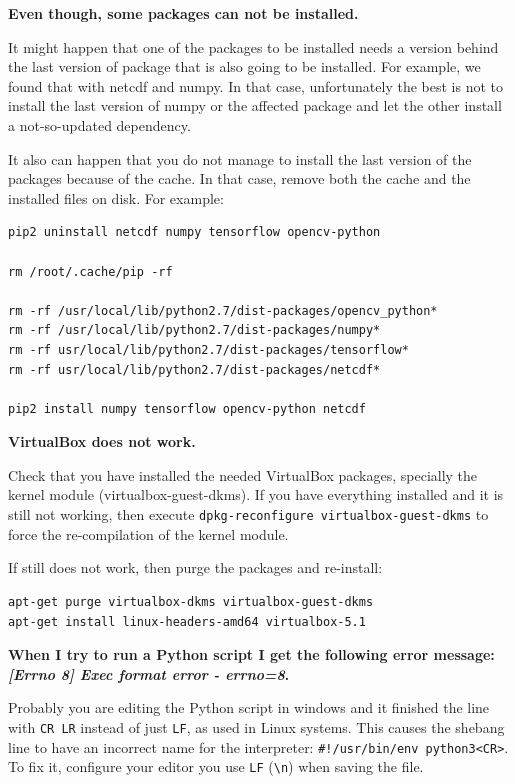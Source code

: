 \documentclass[a4paper,12pt]{article}
\begin{document}
\textbf{Even though, some packages can not be installed.}

It might happen that one of the packages to be installed needs a version behind the last version of package that is also going to be installed. For example, we found that with netcdf and numpy. In that case, unfortunately the best is not to install the last version of numpy or the affected package and let the other install a not-so-updated dependency.

It also can happen that you do not manage to install the last version of the packages because of the cache. In that case, remove both the cache and the installed files on disk. For example:

\begin{verbatim}
pip2 uninstall netcdf numpy tensorflow opencv-python

rm /root/.cache/pip -rf

rm -rf /usr/local/lib/python2.7/dist-packages/opencv_python*
rm -rf /usr/local/lib/python2.7/dist-packages/numpy*
rm -rf usr/local/lib/python2.7/dist-packages/tensorflow*
rm -rf usr/local/lib/python2.7/dist-packages/netcdf*

pip2 install numpy tensorflow opencv-python netcdf
\end{verbatim}
\vspace{0.5cm}

\textbf{VirtualBox does not work.}

Check that you have installed the needed VirtualBox packages, specially the kernel module (virtualbox-guest-dkms).
If you have everything installed and it is still not working, then execute {\tt dpkg-reconfigure virtualbox-guest-dkms} to force the re-compilation of the kernel module.

If still does not work, then purge the packages and re-install:

\begin{verbatim}
apt-get purge virtualbox-dkms virtualbox-guest-dkms
apt-get install linux-headers-amd64 virtualbox-5.1
\end{verbatim}
\vspace{0.5cm}

\textbf{When I try to run a Python script I get the following error message: \emph{[Errno 8] Exec format error - errno=8}.}

Probably you are editing the Python script in windows and it finished the line with {\tt CR LR} instead of just {\tt LF}, as used in Linux systems. This causes the shebang line to have an incorrect name for the interpreter: {\tt \#!/usr/bin/env python3<CR>}. To fix it, configure your editor you use {\tt LF} ({\tt \textbackslash n}) when saving the file.
\vspace{0.5cm}
\end{document}
